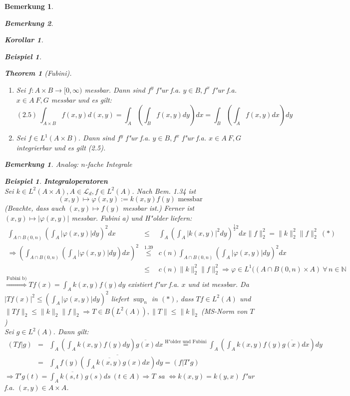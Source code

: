\documentclass[a4paper,11pt]{book}
\newcommand{\N}{{\mathbb N}}
\newcommand{\ssL}{{\mathcal L}}
\newtheorem{Kor}[Def]{Korollar}
\newtheorem*{TheoNO}{Theorem}
\newtheorem*{BspNO}{Beispiel}
\newtheorem{Bsp}[Def]{Beispiel}
\newtheorem*{BemNO}{Bemerkung}
\newtheorem{Bem}[Def]{Bemerkung}
\theoremstyle{nonumberplain}
\begin{document}
\begin{Bem}
\begin{BemNO}
\begin{Kor}
\begin{BspNO}
\begin{enumerate}
\begin{TheoNO}[Fubini]\\
\begin{enumerate}
\item[a)] Sei $f: A \times B \rightarrow [0,\infty)$ messbar. Dann sind $f^y$ f"ur f.a. $y \in B, f^x$ f"ur f.a. $x \in A \ F,G$ messbar und es gilt:
\[
(2.5) \ \int_{A \times B} f(x,y)d(x,y) = \int_A ( \int_B f(x,y)dy)dx = \int_B ( \int_A f(x,y)dx)dy
\]

\item[b)] Sei $f \in L^1(A \times B)$. Dann sind $f^y$ f"ur f.a. $y \in B, f^x$ f"ur f.a. $x \in A \ F,G$ integrierbar und es gilt (2.5).
\end{enumerate}
\end{TheoNO}


\begin{BemNO}
Analog: $n$-fache Integrale
\end{BemNO}


\begin{Bsp}
\textbf{Integraloperatoren}\\
Sei $k \in L^2(A \times A), A \in \ssL_d, f \in L^2(A)$. Nach Bem. 1.34 ist
\[
(x,y) \mapsto \varphi(x,y) := k(x,y)f(y) \text{ messbar}
\]
(Beachte, dass auch $(x,y) \mapsto f(y)$ messbar ist.) Ferner ist $(x,y) \mapsto |\varphi(x,y)|$ messbar. Fubini a) und H"older liefern:
\begin{eqnarray*}
\int_{A \cap B(0,n)} ( \int_A |\varphi(x,y)|dy)^2 dx & \leq & \int_A ( \int_A |k(x,y)|^2 dy)^{\frac12 2} dx \|f\|_2^2 = \|k\|_2^2 \|f\|_2^2 \ (\ast)\\
\Rightarrow ( \int_{A \cap B(0,n)} ( \int_A |\varphi(x,y)|dy)dx)^2 & \stackrel{1.39}{\leq} & c(n) \int_{A \cap B(0,n)} ( \int_A |\varphi(x,y)|dy)^2 dx\\
& \leq & c(n) \|k\|_2^2 \|f\|_2^2 \Rightarrow \varphi \in L^1((A \cap B(0,n) \times A) \ \forall\, n \in \N
\end{eqnarray*}
$\stackrel{\text{Fubini b)}}{\Rightarrow} Tf(x) = \int_A k(x,y)f(y)dy$ existiert f"ur f.a. $x$ und ist messbar. Da $|Tf(x)|^2 \leq (\int_A |\varphi(x,y)|dy)^2$ liefert $\sup_n$ in $(\ast)$, dass $Tf \in L^2(A)$ und $\|Tf\|_2 \leq \|k\|_2 \|f\|_2 \Rightarrow T \in B(L^2(A)), \|T\| \leq \|k\|_2 \ $(MS-Norm von $T$)\\
Sei $g \in L^2(A)$. Dann gilt:
\begin{eqnarray*}
(Tf|g) & = & \int_A (\int_A k(x,y)f(y)dy)\overline{g(x)}dx \stackrel{\text{H"older und Fubini}}{=} \int_A (\int_A k(x,y)f(y)\overline{g(x)} dx)dy \\
& = & \int_A f(y) \overline{(\int_A \overline{k(x,y)} g(x) dx)}dy = (f|T'g)
\end{eqnarray*}
$\Rightarrow T'g(t) = \int_A \overline{k(s,t)}g(s) ds \ (t \in A) \Rightarrow T$ sa $\Longleftrightarrow k(x,y) = k(y,x)$ f"ur f.a. $(x,y) \in A \times A$.
\end{Bsp}



\end{enumerate}
\end{BspNO}
\end{Kor}
\end{BemNO}
\end{Bem}
\end{document}
